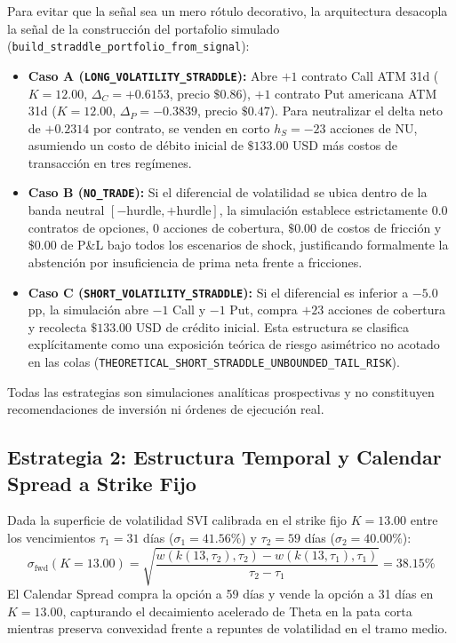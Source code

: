 \documentclass[11pt,a4paper]{article}
\begin{document}
Para evitar que la señal sea un mero rótulo decorativo, la arquitectura desacopla la señal de la construcción del portafolio simulado (\texttt{build\_straddle\_portfolio\_from\_signal}):
\begin{itemize}
    \item \textbf{Caso A (\texttt{LONG\_VOLATILITY\_STRADDLE}):} Abre $+1$ contrato Call ATM 31d ($K=12.00$, $\Delta_C = +0.6153$, precio $\$0.86$), $+1$ contrato Put americana ATM 31d ($K=12.00$, $\Delta_P = -0.3839$, precio $\$0.47$). Para neutralizar el delta neto de $+0.2314$ por contrato, se venden en corto $h_S = -23$ acciones de NU, asumiendo un costo de débito inicial de $\$133.00$ USD más costos de transacción en tres regímenes.
    \item \textbf{Caso B (\texttt{NO\_TRADE}):} Si el diferencial de volatilidad se ubica dentro de la banda neutral $[-\text{hurdle}, +\text{hurdle}]$, la simulación establece estrictamente $0.0$ contratos de opciones, $0$ acciones de cobertura, $\$0.00$ de costos de fricción y $\$0.00$ de P\&L bajo todos los escenarios de shock, justificando formalmente la abstención por insuficiencia de prima neta frente a fricciones.
    \item \textbf{Caso C (\texttt{SHORT\_VOLATILITY\_STRADDLE}):} Si el diferencial es inferior a $-5.0$ pp, la simulación abre $-1$ Call y $-1$ Put, compra $+23$ acciones de cobertura y recolecta $\$133.00$ USD de crédito inicial. Esta estructura se clasifica explícitamente como una exposición teórica de riesgo asimétrico no acotado en las colas (\texttt{THEORETICAL\_SHORT\_STRADDLE\_UNBOUNDED\_TAIL\_RISK}).
\end{itemize}
Todas las estrategias son simulaciones analíticas prospectivas y no constituyen recomendaciones de inversión ni órdenes de ejecución real.

\subsection{Estrategia 2: Estructura Temporal y Calendar Spread a Strike Fijo}
Dada la superficie de volatilidad SVI calibrada en el strike fijo $K = 13.00$ entre los vencimientos $\tau_1 = 31$ días ($\sigma_1 = 41.56\%$) y $\tau_2 = 59$ días ($\sigma_2 = 40.00\%$):
\begin{equation}
    \sigma_{\text{fwd}}(K=13.00) = \sqrt{\frac{w(k(13, \tau_2), \tau_2) - w(k(13, \tau_1), \tau_1)}{\tau_2 - \tau_1}} = 38.15\%
\end{equation}
El Calendar Spread compra la opción a 59 días y vende la opción a 31 días en $K = 13.00$, capturando el decaimiento acelerado de Theta en la pata corta mientras preserva convexidad frente a repuntes de volatilidad en el tramo medio.
\end{document}

